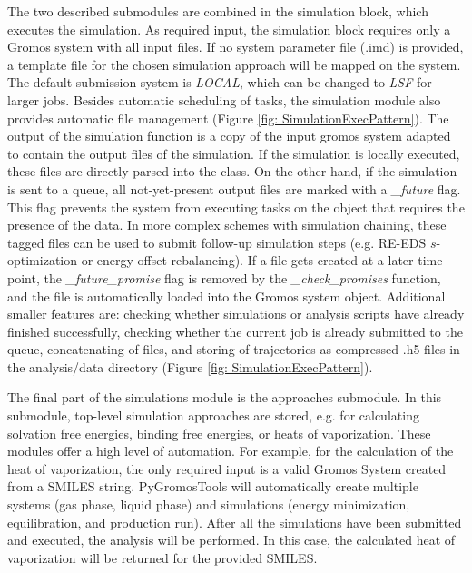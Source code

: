 The two described submodules are combined in the simulation block, which executes the simulation. As required input, the simulation block requires only a Gromos system with all input files. If no system parameter file (.imd) is provided, a template file for the chosen simulation approach will be mapped on the system. The default submission system is \textit{LOCAL}, which can be changed to \textit{LSF} for larger jobs. Besides automatic scheduling of tasks, the simulation module also provides automatic file management (Figure \ref{fig: SimulationExecPattern}). The output of the simulation function is a copy of the input gromos system adapted to contain the output files of the simulation. If the simulation is locally executed, these files are directly parsed into the class. On the other hand, if the simulation is sent to a queue, all not-yet-present output files are marked with a \textit{\_future} flag. This flag prevents the system from executing tasks on the object that requires the presence of the data. In more complex schemes with simulation chaining, these tagged files can be used to submit follow-up simulation steps (e.g. RE-EDS $s$-optimization or energy offset rebalancing\cite{Ries2021}). If a file gets created at a later time point, the \textit{\_future\_promise} flag is removed by the \textit{\_check\_promises} function, and the file is automatically loaded into the Gromos system object.
Additional smaller features are: checking whether simulations or analysis scripts have already finished successfully, checking whether the current job is already submitted to the queue, concatenating of files, and storing of trajectories as compressed .h5 files in the analysis/data directory (Figure \ref{fig: SimulationExecPattern}).

The final part of the simulations module is the approaches submodule. In this submodule, top-level simulation approaches are stored, e.g. for calculating solvation free energies, binding free energies, or heats of vaporization. These modules offer a high level of automation. For example, for the calculation of the heat of vaporization, the only required input is a valid Gromos System created from a SMILES string. PyGromosTools will automatically create multiple systems (gas phase, liquid phase) and simulations (energy minimization, equilibration, and production run). After all the simulations have been submitted and executed, the analysis will be performed. In this case, the calculated heat of vaporization will be returned for the provided SMILES.


